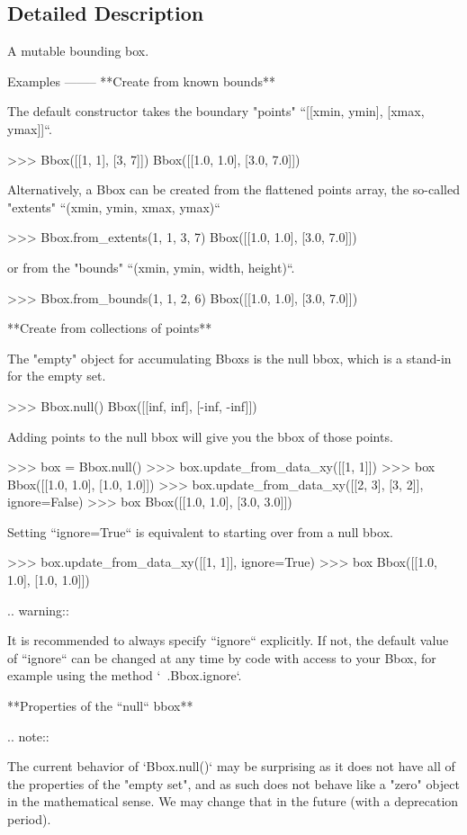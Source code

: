 \subsection{Detailed Description}
\begin{DoxyVerb}A mutable bounding box.

Examples
--------
**Create from known bounds**

The default constructor takes the boundary "points" ``[[xmin, ymin],
[xmax, ymax]]``.

    >>> Bbox([[1, 1], [3, 7]])
    Bbox([[1.0, 1.0], [3.0, 7.0]])

Alternatively, a Bbox can be created from the flattened points array, the
so-called "extents" ``(xmin, ymin, xmax, ymax)``

    >>> Bbox.from_extents(1, 1, 3, 7)
    Bbox([[1.0, 1.0], [3.0, 7.0]])

or from the "bounds" ``(xmin, ymin, width, height)``.

    >>> Bbox.from_bounds(1, 1, 2, 6)
    Bbox([[1.0, 1.0], [3.0, 7.0]])

**Create from collections of points**

The "empty" object for accumulating Bboxs is the null bbox, which is a
stand-in for the empty set.

    >>> Bbox.null()
    Bbox([[inf, inf], [-inf, -inf]])

Adding points to the null bbox will give you the bbox of those points.

    >>> box = Bbox.null()
    >>> box.update_from_data_xy([[1, 1]])
    >>> box
    Bbox([[1.0, 1.0], [1.0, 1.0]])
    >>> box.update_from_data_xy([[2, 3], [3, 2]], ignore=False)
    >>> box
    Bbox([[1.0, 1.0], [3.0, 3.0]])

Setting ``ignore=True`` is equivalent to starting over from a null bbox.

    >>> box.update_from_data_xy([[1, 1]], ignore=True)
    >>> box
    Bbox([[1.0, 1.0], [1.0, 1.0]])

.. warning::

    It is recommended to always specify ``ignore`` explicitly.  If not, the
    default value of ``ignore`` can be changed at any time by code with
    access to your Bbox, for example using the method `~.Bbox.ignore`.

**Properties of the ``null`` bbox**

.. note::

    The current behavior of `Bbox.null()` may be surprising as it does
    not have all of the properties of the "empty set", and as such does
    not behave like a "zero" object in the mathematical sense. We may
    change that in the future (with a deprecation period).


\end{DoxyVerb}
